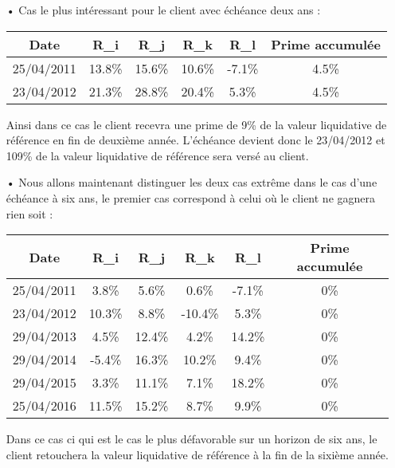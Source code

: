 \documentclass[french,12pt,a4paper]{article}
\begin{document}
\begin{itemize}
\item[•]
Cas le plus intéressant pour le client avec échéance deux ans :\\

\begin{center}
\begin{tabular}{|c|c|c|c|c|c|}
  \hline
  Date & R_{i} & R_{j} & R_{k} & R_{l} & Prime accumulée \\
  \hline
  25/04/2011 & 13.8\% & 15.6\% & 10.6\% & -7.1\% & 4.5\% \\
  23/04/2012 & 21.3\% & 28.8\% & 20.4\% & 5.3\% & 4.5\% \\
  \hline
\end{tabular}
\end{center}

Ainsi dans ce cas le client recevra une prime de 9\% de la valeur liquidative de référence en fin de deuxième année. L'échéance devient donc le 23/04/2012 et 109\% de la valeur liquidative de référence sera versé au client.\\

\item[•]
Nous allons maintenant distinguer les deux cas extrême dans le cas d'une échéance à six ans, le premier cas correspond à celui où le client ne gagnera rien soit :
\begin{center}
\begin{tabular}{|c|c|c|c|c|c|}
  \hline
  Date & R_{i} & R_{j} & R_{k} & R_{l} & Prime accumulée \\
  \hline
  25/04/2011 & 3.8\% & 5.6\% & 0.6\% & -7.1\% & 0\% \\
  23/04/2012 & 10.3\% & 8.8\% & -10.4\% & 5.3\% & 0\% \\
  29/04/2013 & 4.5\% & 12.4\% & 4.2\% & 14.2\% & 0\%\\
  29/04/2014 & -5.4\% & 16.3\% & 10.2\% & 9.4\% & 0\%\\
  29/04/2015 & 3.3\% & 11.1\% & 7.1\% & 18.2\% & 0\%\\
  25/04/2016 & 11.5\% & 15.2\% & 8.7\% & 9.9\% & 0\%\\
  \hline
\end{tabular}
\end{center}

Dans ce cas ci qui est le cas le plus défavorable sur un horizon de six ans, le client retouchera la valeur liquidative de référence à la fin de la sixième année.


\end{itemize}
\end{document}
